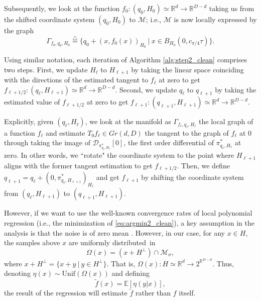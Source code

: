 \documentclass[12pt]{article}
\theoremstyle{remark}
\newcommand{\RR}{\mathbb{R}}
\newcommand{\MM}{\mathcal{M}}
\newcommand{\DD}{\mathcal{D}}
\newcommand{\defeq}{\stackrel{\bigtriangleup}{=}}
\newcommand{\wtilde}[1]{\widetilde{#1}}
\begin{document}
Subsequently, we look at the function $f_0:(q_0,H_0) \simeq \RR^d\to\RR^{D-d}$ taking us from the shifted coordinate system $(q_0, H_0)$ to $\MM$; i.e., $\MM$ is now locally expressed by the graph 
\begin{equation}
 \Gamma_{f_0, q_0, H_0} \defeq \{q_{0} + (x, f_0(x))_{H_0} ~|~ x\in B_{H_0}(0,c_{\pi/4}\tau)\}
.\end{equation}

Using similar notation, each iteration of Algorithm \ref{alg:step2_clean} comprises two steps. First, we update $H_\ell$ to $H_{\ell + 1}$ by taking the linear space coinciding with the directions of the estimated tangent to $f_{\ell }$ at zero to get $f_{\ell+ 1/2}:(q_\ell, H_{\ell+1}) \simeq \RR^d \to \RR^{D-d}$. Second, we update $q_\ell$ to $q_{\ell+1} $ by taking the estimated value of $f_{\ell+1/2}$ at zero to get $f_{\ell+1}:(q_{\ell+1},H_{\ell+1}) \simeq \RR^d \to \RR^{D-d}$.

Explicitly, given $(q_{\ell}, H_{\ell})$, we look at the manifold as $\Gamma_{f_{\ell}, q_{\ell}, H_{\ell}}$ the local graph of a function $f_{\ell}$ and estimate $T_0 f_{\ell} \in Gr(d, D)$ the tangent to the graph of $f_{\ell}$ at $0$ through taking the image of $\DD_{\pi^*_{q_{\ell}, H_{\ell}}}[0]$, the first order differential of $\pi^*_{q_{\ell }, H_{\ell }}$ at zero.
In other words, we ``rotate" the coordinate system to the point where $H_{\ell+1}$ aligns with the former tangent estimation to get $f_{\ell+1/2}$. 
Then, we define 
 $ q_{\ell+1}  =  q_\ell + ( 0 , \pi^*_{q_\ell, H_{\ell+1}} )_{H_\ell} $ and get $f_{\ell +1}$ by shifting the coordinate system from $(q_\ell, H_{\ell+1})$ to $(q_{\ell+1}, H_{\ell+1})$.

However, if we want to use the well-known convergence rates of local polynomial regression (i.e., the minimization of \eqref{eq:argmin2_clean}), a key assumption in the analysis is that the noise is of zero mean \cite{stone1980optimal}. 
However, in our case, for any $x\in H$, the samples above $x$ are uniformly distributed~in 
\begin{equation}\label{eq:Omega_def}
\Omega(x) = (x + H^\perp) \cap  \MM_\sigma
,\end{equation}
where $x + H^\perp = \{x + y ~|~ y\in H^\perp\}$.
That is, $\Omega(x):H \simeq \RR^d \to 2^{\RR^{D-d}}$.
Thus, denoting $\eta(x)\sim \textrm{Unif}(\Omega(x))$ and defining 
\begin{equation}\label{eq:ftilde_def_general}
\wtilde f(x) = \mathbb{E}[\eta(y | x)]    
,\end{equation}
the result of the regression will estimate $\wtilde f$ rather than $f$ itself.
\end{document}
